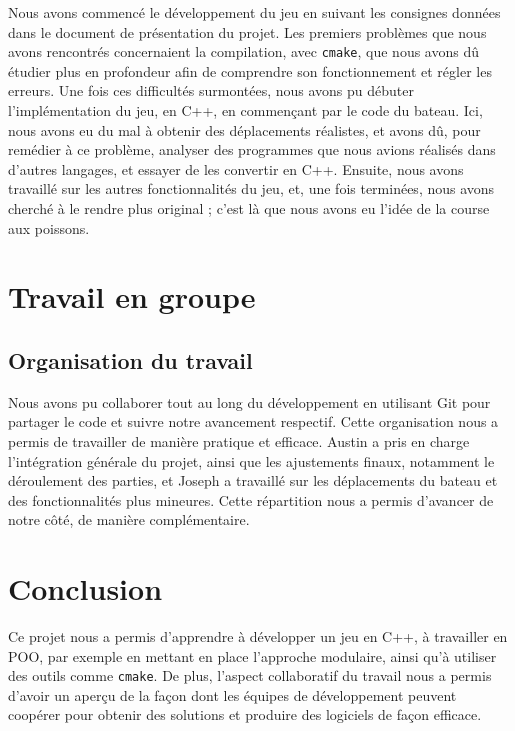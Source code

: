 \documentclass[a4paper,12pt]{article}
\begin{document}
Nous avons commencé le développement du jeu en suivant les consignes données dans le document de présentation du projet. Les premiers problèmes que nous avons rencontrés concernaient la compilation, avec \texttt{cmake}, que nous avons dû étudier plus en profondeur afin de comprendre son fonctionnement et régler les erreurs. Une fois ces difficultés surmontées, nous avons pu débuter l'implémentation du jeu, en C++, en commençant par le code du bateau. Ici, nous avons eu du mal à obtenir des déplacements réalistes, et avons dû, pour remédier à ce problème, analyser des programmes que nous avions réalisés dans d'autres langages, et essayer de les convertir en C++. Ensuite, nous avons travaillé sur les autres fonctionnalités du jeu, et, une fois terminées, nous avons cherché à le rendre plus original ; c'est là que nous avons eu l'idée de la course aux poissons. 

\section{Travail en groupe}

\subsection{Organisation du travail}
Nous avons pu collaborer tout au long du développement en utilisant Git pour partager le code et suivre notre avancement respectif. Cette organisation nous a permis de travailler de manière pratique et efficace. Austin a pris en charge l’intégration générale du projet, ainsi que les ajustements finaux, notamment le déroulement des parties, et Joseph a travaillé sur les déplacements du bateau et des fonctionnalités plus mineures. Cette répartition nous a permis d’avancer de notre côté, de manière complémentaire.



\section{Conclusion}
Ce projet nous a permis d'apprendre à développer un jeu en C++, à travailler en POO, par exemple en mettant en place l'approche modulaire, ainsi qu'à utiliser des outils comme \texttt{cmake}. De plus, l'aspect collaboratif du travail nous a permis d'avoir un aperçu de la façon dont les équipes de développement peuvent coopérer pour obtenir des solutions et produire des logiciels de façon efficace.
\end{document}
